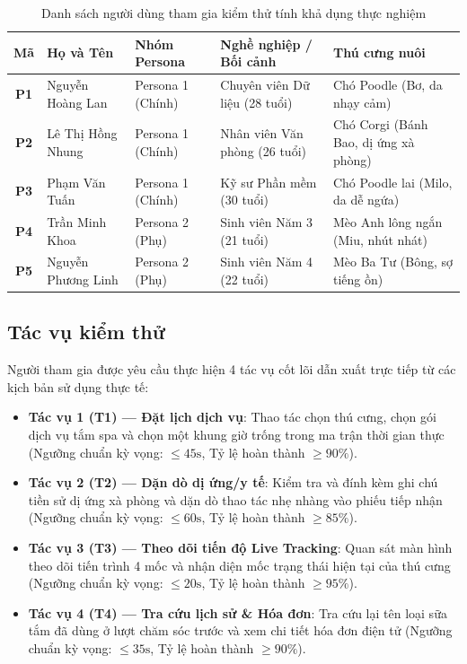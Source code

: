 \begin{table}[H]
  \centering
  \small
  \begin{tabularx}{\textwidth}{|c|p{2.8cm}|p{2.2cm}|X|p{3.2cm}|}
    \hline
    \textbf{Mã} & \textbf{Họ và Tên} & \textbf{Nhóm Persona} & \textbf{Nghề nghiệp / Bối cảnh} & \textbf{Thú cưng nuôi} \\ \hline
    \textbf{P1} & Nguyễn Hoàng Lan & Persona 1 (Chính) & Chuyên viên Dữ liệu (28 tuổi) & Chó Poodle (Bơ, da nhạy cảm) \\ \hline
    \textbf{P2} & Lê Thị Hồng Nhung & Persona 1 (Chính) & Nhân viên Văn phòng (26 tuổi) & Chó Corgi (Bánh Bao, dị ứng xà phòng) \\ \hline
    \textbf{P3} & Phạm Văn Tuấn & Persona 1 (Chính) & Kỹ sư Phần mềm (30 tuổi) & Chó Poodle lai (Milo, da dễ ngứa) \\ \hline
    \textbf{P4} & Trần Minh Khoa & Persona 2 (Phụ) & Sinh viên Năm 3 (21 tuổi) & Mèo Anh lông ngắn (Miu, nhút nhát) \\ \hline
    \textbf{P5} & Nguyễn Phương Linh & Persona 2 (Phụ) & Sinh viên Năm 4 (22 tuổi) & Mèo Ba Tư (Bông, sợ tiếng ồn) \\ \hline
  \end{tabularx}
  \caption{Danh sách người dùng tham gia kiểm thử tính khả dụng thực nghiệm}
  \label{tab:test_participants}
\end{table}

\subsection{Tác vụ kiểm thử}
Người tham gia được yêu cầu thực hiện 4 tác vụ cốt lõi dẫn xuất trực tiếp từ các kịch bản sử dụng thực tế:
\begin{itemize}
  \item \textbf{Tác vụ 1 (T1) --- Đặt lịch dịch vụ}: Thao tác chọn thú cưng, chọn gói dịch vụ tắm spa và chọn một khung giờ trống trong ma trận thời gian thực (Ngưỡng chuẩn kỳ vọng: $\le 45\text{s}$, Tỷ lệ hoàn thành $\ge 90\%$).
  \item \textbf{Tác vụ 2 (T2) --- Dặn dò dị ứng/y tế}: Kiểm tra và đính kèm ghi chú tiền sử dị ứng xà phòng và dặn dò thao tác nhẹ nhàng vào phiếu tiếp nhận (Ngưỡng chuẩn kỳ vọng: $\le 60\text{s}$, Tỷ lệ hoàn thành $\ge 85\%$).
  \item \textbf{Tác vụ 3 (T3) --- Theo dõi tiến độ Live Tracking}: Quan sát màn hình theo dõi tiến trình 4 mốc và nhận diện mốc trạng thái hiện tại của thú cưng (Ngưỡng chuẩn kỳ vọng: $\le 20\text{s}$, Tỷ lệ hoàn thành $\ge 95\%$).
  \item \textbf{Tác vụ 4 (T4) --- Tra cứu lịch sử \& Hóa đơn}: Tra cứu lại tên loại sữa tắm đã dùng ở lượt chăm sóc trước và xem chi tiết hóa đơn điện tử (Ngưỡng chuẩn kỳ vọng: $\le 35\text{s}$, Tỷ lệ hoàn thành $\ge 90\%$).
\end{itemize}

